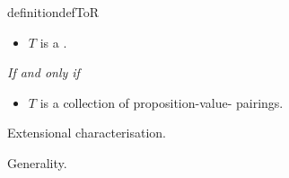 \begin{note}
  \begin{restatable}[\tor{2}]{definition}{defToR}
    \label{def:type-r}
    \mbox{ }
    \vspace{-\baselineskip}
    \begin{itemize}
    \item
      \(T\) is a \emph{}.
    \end{itemize}

    \emph{If and only if}

    \begin{itemize}
    \item
      \(T\) is a collection of proposition-value-\poP{} pairings.
    \end{itemize}
    \vspace{-\baselineskip}
  \end{restatable}

  Extensional characterisation.

  Generality.
\end{note}

\subsection{}
\label{cha:typical:sec:tor:illus}


